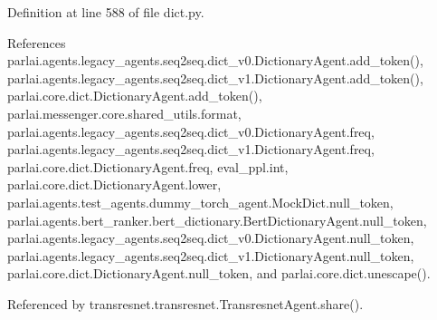 Definition at line 588 of file dict.\+py.



References parlai.\+agents.\+legacy\+\_\+agents.\+seq2seq.\+dict\+\_\+v0.\+Dictionary\+Agent.\+add\+\_\+token(), parlai.\+agents.\+legacy\+\_\+agents.\+seq2seq.\+dict\+\_\+v1.\+Dictionary\+Agent.\+add\+\_\+token(), parlai.\+core.\+dict.\+Dictionary\+Agent.\+add\+\_\+token(), parlai.\+messenger.\+core.\+shared\+\_\+utils.\+format, parlai.\+agents.\+legacy\+\_\+agents.\+seq2seq.\+dict\+\_\+v0.\+Dictionary\+Agent.\+freq, parlai.\+agents.\+legacy\+\_\+agents.\+seq2seq.\+dict\+\_\+v1.\+Dictionary\+Agent.\+freq, parlai.\+core.\+dict.\+Dictionary\+Agent.\+freq, eval\+\_\+ppl.\+int, parlai.\+core.\+dict.\+Dictionary\+Agent.\+lower, parlai.\+agents.\+test\+\_\+agents.\+dummy\+\_\+torch\+\_\+agent.\+Mock\+Dict.\+null\+\_\+token, parlai.\+agents.\+bert\+\_\+ranker.\+bert\+\_\+dictionary.\+Bert\+Dictionary\+Agent.\+null\+\_\+token, parlai.\+agents.\+legacy\+\_\+agents.\+seq2seq.\+dict\+\_\+v0.\+Dictionary\+Agent.\+null\+\_\+token, parlai.\+agents.\+legacy\+\_\+agents.\+seq2seq.\+dict\+\_\+v1.\+Dictionary\+Agent.\+null\+\_\+token, parlai.\+core.\+dict.\+Dictionary\+Agent.\+null\+\_\+token, and parlai.\+core.\+dict.\+unescape().



Referenced by transresnet.\+transresnet.\+Transresnet\+Agent.\+share().

